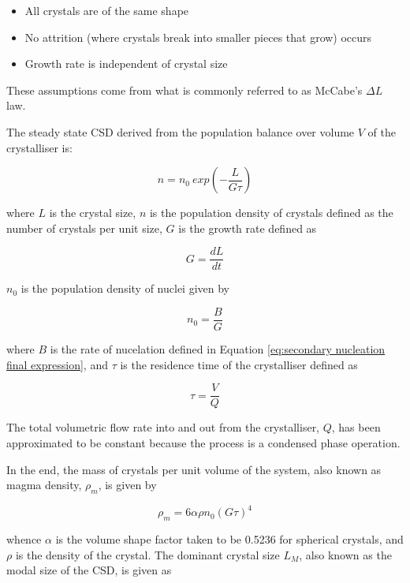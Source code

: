 \begin{itemize}
    \item All crystals are of the same shape
    \item No attrition (where crystals break into smaller pieces that grow) occurs
    \item Growth rate is independent of crystal size
\end{itemize}

\noindent These assumptions come from what is commonly referred to as McCabe's $\Delta L$ law. 

The steady state CSD derived from the population balance over volume $V$ of the crystalliser is:

\begin{equation}
    n = n_0 ~exp(-\frac{L}{G\tau})
\end{equation}

\noindent where $L$ is the crystal size, $n$ is the population density of crystals defined as the number of crystals per unit size, $G$ is the growth rate defined as 

\begin{equation}
    G = \frac{dL}{dt}
\end{equation}

\noindent $n_0$ is the population density of nuclei given by 

\begin{equation}
    n_0 = \frac{B}{G}
\end{equation}

\noindent where $B$ is the rate of nucelation defined in Equation \ref{eq:secondary nucleation final expression}, and $\tau$ is the residence time of the crystalliser defined as 

\begin{equation}
    \tau = \frac{V}{Q}
\end{equation}

\noindent The total volumetric flow rate into and out from the crystalliser, $Q$, has been approximated to be constant because the process is a condensed phase operation. \cite{levenspiel_chemical_1999} 

In the end, the mass of crystals per unit volume of the system, also known as magma density, $\rho_m$, is given by

\begin{equation} \label{eq:magma density}
    \rho_m = 6 \alpha \rho n_0 (G \tau)^4
\end{equation}

\noindent whence $\alpha$ is the volume shape factor taken to be 0.5236 for spherical crystals, and $\rho$ is the density of the crystal. The dominant crystal size $L_M$, also known as the modal size of the CSD, is given as 

